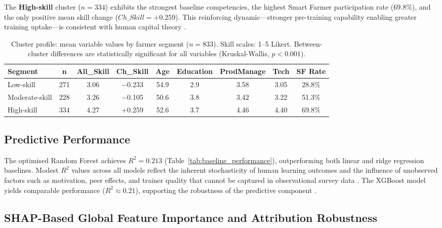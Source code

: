 \documentclass[3p,twocolumn,authoryear]{elsarticle}
\begin{document}
The \textbf{High-skill} cluster ($n = 334$) exhibits the strongest
baseline competencies, the highest Smart Farmer participation rate
(69.8\%), and the only positive mean skill change ($Ch\_Skill = +0.259$).
This reinforcing dynamic---stronger pre-training capability enabling
greater training uptake---is consistent with human capital theory
\citep{feder1985,davis2012}.

\begin{table}[htbp]
\centering
\caption{Cluster profile: mean variable values by farmer segment
  ($n = 833$). Skill scales: 1--5 Likert. Between-cluster differences
  are statistically significant for all variables (Kruskal-Wallis,
  $p < 0.001$).}
\label{tab:cluster_profile}
\begin{tabular}{@{}lcccccccc@{}}
\toprule
\textbf{Segment} & \textbf{n} & \textbf{All\_Skill}
  & \textbf{Ch\_Skill} & \textbf{Age}
  & \textbf{Education} & \textbf{ProdManage}
  & \textbf{Tech} & \textbf{SF Rate} \\
\midrule
Low-skill      & 271 & 3.06 & $-$0.233 & 54.9 & 2.9 & 3.58 & 3.05 & 28.8\% \\
Moderate-skill & 228 & 3.26 & $-$0.105 & 50.6 & 3.8 & 3.42 & 3.22 & 51.3\% \\
High-skill     & 334 & 4.27 & $+$0.259 & 52.6 & 3.7 & 4.46 & 4.40 & 69.8\% \\
\bottomrule
\end{tabular}
\end{table}

\subsection{Predictive Performance}

The optimised Random Forest achieves $R^{2} = 0.213$
(Table~\ref{tab:baseline_performance}), outperforming both linear and
ridge regression baselines.
Modest $R^{2}$ values across all models reflect the inherent
stochasticity of human learning outcomes and the influence of unobserved
factors such as motivation, peer effects, and trainer quality that cannot
be captured in observational survey data \citep{davis2012}.
The XGBoost model yields comparable performance
($R^{2} \approx 0.21$), supporting the robustness of the predictive
component \citep{chen2016}.

\subsection{SHAP-Based Global Feature Importance and Attribution
            Robustness}
\end{document}
